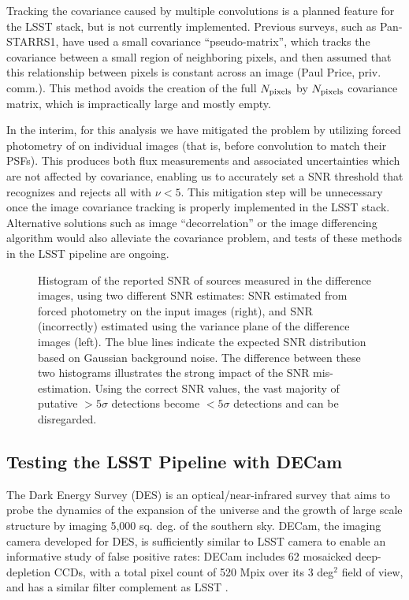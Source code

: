 Tracking the covariance caused by multiple convolutions is a planned feature for
the LSST stack, but is not currently implemented. Previous surveys, such as
Pan-STARRS1, have used a small covariance ``pseudo-matrix'', which tracks the
covariance between a small region of neighboring pixels, and then assumed that
this relationship between pixels is constant across an image (Paul Price, priv. comm.).
This method avoids the creation of the full $N_{\rm pixels}$ by $N_{\rm pixels}$
covariance matrix, which is impractically large and mostly empty.

In the interim, for this analysis we have mitigated the problem by utilizing forced photometry of \DIASources
on individual images (that is, before convolution to match their PSFs). This
produces both flux measurements and associated uncertainties which are not
affected by covariance, enabling us to accurately set a SNR threshold
that recognizes and rejects all \DIASources with $\nu < 5$. This mitigation step
will be unnecessary once the image covariance tracking is properly implemented
in the LSST stack. Alternative solutions such as image ``decorrelation''
\citep{DMTN-021} or the \citet{zackay} image differencing algorithm would also
alleviate the covariance problem, and tests of these methods in the LSST pipeline are ongoing.


\begin{figure}
  \centering
  \caption{
  Histogram of the reported SNR of sources measured in the difference images,
  using two different SNR estimates: SNR estimated from forced photometry on
  the input images (right), and SNR (incorrectly) estimated using the variance plane
  of the difference images (left). The blue lines indicate the expected SNR distribution
  based on Gaussian background noise. The difference between these two histograms
  illustrates the strong impact of the SNR mis-estimation. Using the correct SNR values,
  the vast majority of putative $>5 \sigma$ detections become $<5 \sigma$ detections
  and can be disregarded.
  }
  \label{fig:snr_comparison}
\end{figure}


\subsection{Testing the LSST Pipeline with DECam}

The Dark Energy Survey (DES) is an optical/near-infrared survey that aims to probe the
dynamics of the expansion of the universe and the growth of large scale structure by
imaging 5,000 sq. deg. of the southern sky. DECam, the imaging camera developed for
DES, is sufficiently similar to LSST camera to enable an informative study of false positive
rates: DECam includes 62 mosaicked deep-depletion CCDs, with a total pixel count of
520 Mpix over its 3 deg$^2$ field of view, and has a similar filter complement as LSST \citep{DECam}.

